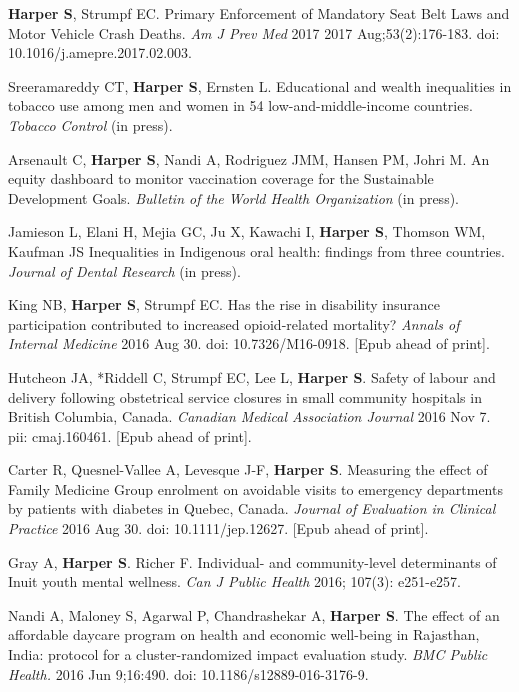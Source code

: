 \documentclass[
  letterpaper,
  DIV=11,
  numbers=noendperiod]{scrartcl}
\begin{document}
\begin{etaremune}
\item \textbf{Harper S}, Strumpf EC. Primary Enforcement of Mandatory Seat Belt Laws and Motor Vehicle Crash Deaths. \emph{Am J Prev Med} 2017 2017 Aug;53(2):176-183. doi: 10.1016/j.amepre.2017.02.003.

\item Sreeramareddy CT, \textbf{Harper S}, Ernsten L. Educational and wealth inequalities in tobacco use among men and women in 54 low-and-middle-income countries. \emph{Tobacco Control} (in press).
 
\item *Arsenault C, \textbf{Harper S}, Nandi A, Rodriguez JMM, Hansen PM, Johri M. An equity dashboard to monitor vaccination coverage for the Sustainable Development Goals. \emph{Bulletin of the World Health Organization} (in press).
 
\item Jamieson L, Elani H, Mejia GC, Ju X, Kawachi I, \textbf{Harper S}, Thomson WM, Kaufman JS Inequalities in Indigenous oral health: findings from three countries. \emph{Journal of Dental Research} (in press).

\item King NB, \textbf{Harper S}, Strumpf EC. Has the rise in disability insurance participation contributed to increased opioid-related mortality? \emph{Annals of Internal Medicine} 2016 Aug 30. doi: 10.7326/M16-0918. [Epub ahead of print].
 
\item Hutcheon JA, *Riddell C, Strumpf EC, Lee L, \textbf{Harper S}. Safety of labour and delivery following obstetrical service closures in small community hospitals in British Columbia, Canada. \emph{Canadian Medical Association Journal} 2016 Nov 7. pii: cmaj.160461. [Epub ahead of print].
 
\item Carter R, Quesnel-Vallee A, Levesque J-F, \textbf{Harper S}. Measuring the effect of Family Medicine Group enrolment on avoidable visits to emergency departments by patients with diabetes in Quebec, Canada. \emph{Journal of Evaluation in Clinical Practice} 2016 Aug 30. doi: 10.1111/jep.12627. [Epub ahead of print].
 
\item *Gray A, \textbf{Harper S}. Richer F. Individual- and community-level determinants of Inuit youth mental wellness. \emph{Can J Public Health} 2016; 107(3): e251-e257.
 
\item Nandi A, Maloney S, Agarwal P, Chandrashekar A, \textbf{Harper S}. The effect of an affordable daycare program on health and economic well-being in Rajasthan, India: protocol for a cluster-randomized impact evaluation study. \emph{BMC Public Health.} 2016 Jun 9;16:490. doi: 10.1186/s12889-016-3176-9.
 

\end{etaremune}
\end{document}
